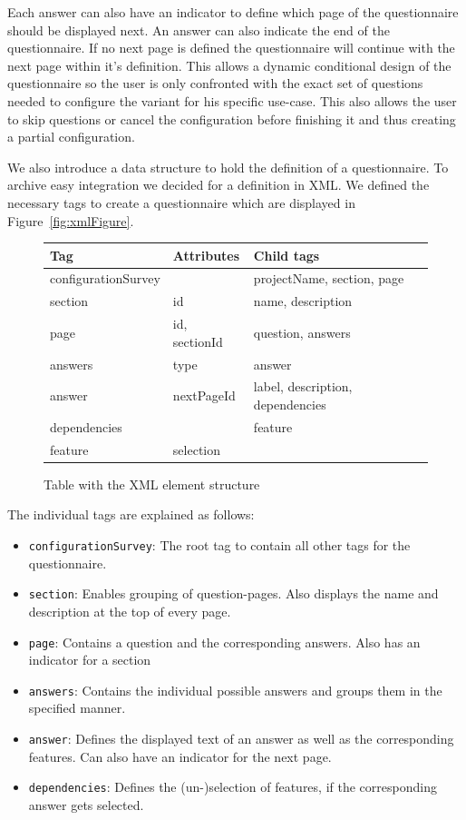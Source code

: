 Each answer can also have an indicator to define which page of the questionnaire should be displayed next. An answer can also indicate the end of the questionnaire. If no next page is defined the questionnaire will continue with the next page within it's definition. This allows a dynamic conditional design of the questionnaire so the user is only confronted with the exact set of questions needed to configure the variant for his specific use-case. This also allows the user to skip questions or cancel the configuration before finishing it and thus creating a partial configuration.

We also introduce a data structure to hold the definition of a questionnaire. To archive easy integration we decided for a definition in XML. We defined the necessary tags to create a questionnaire which are displayed in Figure~\ref{fig:xmlFigure}.

\begin{figure}[H]
\begin{tabulary}{\linewidth}{| L | L | L |}
	\hline
	\textbf{Tag} 		& \textbf{\mbox{Attributes}} & \textbf{Child tags}	\\ \hline
		
	configurationSurvey & 				& projectName, section, page		\\ \hline
	section 			& id 			& name, description					\\ \hline
	page 				& id, sectionId & question, answers					\\ \hline
	answers 			& type 			& answer							\\ \hline
	answer 				& nextPageId 	& label, description, dependencies	\\ \hline
	dependencies		& 				& feature							\\ \hline
	feature 			& selection 	& 									\\ \hline
\end{tabulary}
\caption{Table with the XML element structure}
\label{tab-xmlelements}
\end{figure}

The individual tags are explained as follows:
\begin{itemize}
\item \texttt{configurationSurvey}: The root tag to contain all other tags for the questionnaire.
\item \texttt{section}: Enables grouping of question-pages. Also displays the name and description at the top of every page.
\item \texttt{page}: Contains a question and the corresponding answers. Also has an indicator for a section
\item \texttt{answers}: Contains the individual possible answers and groups them in the specified manner.
\item \texttt{answer}: Defines the displayed text of an answer as well as the corresponding features. Can also have an indicator for the next page.
\item \texttt{dependencies}: Defines the (un-)selection of features, if the corresponding answer gets selected.
\end{itemize}

